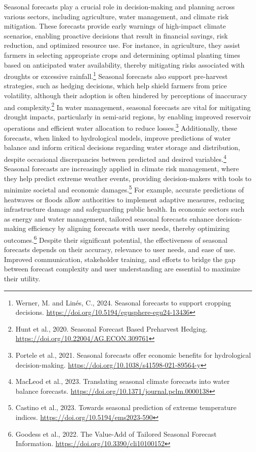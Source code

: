 Seasonal forecasts play a crucial role in decision-making and planning across various sectors, including agriculture, water management, and climate risk mitigation. These forecasts provide early warnings of high-impact climate scenarios, enabling proactive decisions that result in financial savings, risk reduction, and optimized resource use. For instance, in agriculture, they assist farmers in selecting appropriate crops and determining optimal planting times based on anticipated water availability, thereby mitigating risks associated with droughts or excessive rainfall.\footnote{Werner, M. and Linés, C., 2024. Seasonal forecasts to support cropping decisions. \url{https://doi.org/10.5194/egusphere-egu24-13436}} Seasonal forecasts also support pre-harvest strategies, such as hedging decisions, which help shield farmers from price volatility, although their adoption is often hindered by perceptions of inaccuracy and complexity.\footnote{Hunt et al., 2020. Seasonal Forecast Based Preharvest Hedging. \url{https://doi.org/10.22004/AG.ECON.309761}} In water management, seasonal forecasts are vital for mitigating drought impacts, particularly in semi-arid regions, by enabling improved reservoir operations and efficient water allocation to reduce losses.\footnote{Portele et al., 2021. Seasonal forecasts offer economic benefits for hydrological decision-making. \url{https://doi.org/10.1038/s41598-021-89564-y}} Additionally, these forecasts, when linked to hydrological models, improve predictions of water balance and inform critical decisions regarding water storage and distribution, despite occasional discrepancies between predicted and desired variables.\footnote{MacLeod et al., 2023. Translating seasonal climate forecasts into water balance forecasts. \url{https://doi.org/10.1371/journal.pclm.0000138}} Seasonal forecasts are increasingly applied in climate risk management, where they help predict extreme weather events, providing decision-makers with tools to minimize societal and economic damages.\footnote{Castino et al., 2023. Towards seasonal prediction of extreme temperature indices. \url{https://doi.org/10.5194/ems2023-590}} For example, accurate predictions of heatwaves or floods allow authorities to implement adaptive measures, reducing infrastructure damage and safeguarding public health. In economic sectors such as energy and water management, tailored seasonal forecasts enhance decision-making efficiency by aligning forecasts with user needs, thereby optimizing outcomes.\footnote{Goodess et al., 2022. The Value-Add of Tailored Seasonal Forecast Information. \url{https://doi.org/10.3390/cli10100152}} Despite their significant potential, the effectiveness of seasonal forecasts depends on their accuracy, relevance to user needs, and ease of use. Improved communication, stakeholder training, and efforts to bridge the gap between forecast complexity and user understanding are essential to maximize their utility.



